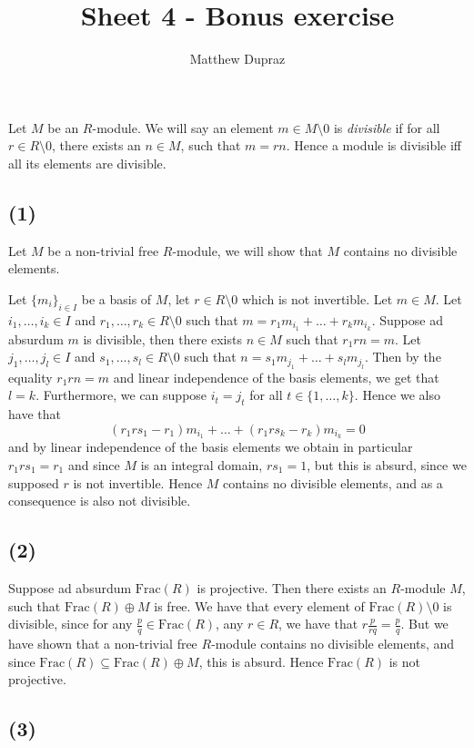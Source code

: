 \documentclass{article}
\title{Sheet 4 - Bonus exercise}
\author{Matthew Dupraz}
\newcommand{\Frac}{\mathrm{Frac}}
\begin{document}
\maketitle

Let $M$ be an $R$-module. We will say an element
$m \in M\setminus 0$ is \emph{divisible} if for all
$r \in R\setminus 0$,
there exists an $n \in M$, such that $m = rn$.
Hence a module is divisible iff all its elements are divisible.
	
\subsection*{(1)}

Let $M$ be a non-trivial free $R$-module, we will show that
$M$ contains no divisible elements.

Let $\{m_i\}_{i \in I}$ be a basis of $M$, let 
$r \in R\setminus 0$ which is not invertible.
Let $m \in M$.
Let $i_1, \dots, i_k \in I$ and $r_1, \dots, r_k \in R\setminus 0$
such that $m = r_1m_{i_1} + \dots + r_km_{i_k}$.
Suppose ad absurdum $m$ is divisible, then there exists
$n \in M$ such that $r_1rn = m$.
Let $j_1, \dots, j_l \in I$ and $s_1, \dots, s_l \in R\setminus 0$
such that $n = s_1m_{j_1} + \dots + s_lm_{j_l}$.
Then by the equality $r_1rn = m$ and linear independence of the
basis elements, we get that $l = k$. Furthermore, we can suppose
$i_t = j_t$ for all $t \in \{1, \dots, k\}$.
Hence we also have that
\[
	(r_1rs_1 - r_1)m_{i_1} + \dots + (r_1rs_k - r_k)m_{i_k} = 0
\]
and by linear independence of the basis elements we obtain in
particular $r_1rs_1 = r_1$ and since $M$ is an integral domain,
$rs_1 = 1$, but this is absurd, since we supposed $r$ is not
invertible. Hence $M$ contains no divisible elements, and as
a consequence is also not divisible.

\subsection*{(2)}

Suppose ad absurdum $\Frac(R)$ is projective. Then there exists
an $R$-module $M$, such that $\Frac(R)\oplus M$ is free.
We have that every element of $\Frac(R)\setminus 0$ is divisible,
since for any
$\frac{p}{q} \in \Frac(R)$, any $r \in R$, we have that
$r\frac{p}{rq}=\frac{p}{q}$.
But we have shown that a non-trivial free $R$-module contains no
divisible elements, and since
$\Frac(R) \subseteq \Frac(R)\oplus M$,
this is absurd. Hence $\Frac(R)$ is not projective.

\subsection*{(3)}
\end{document}
